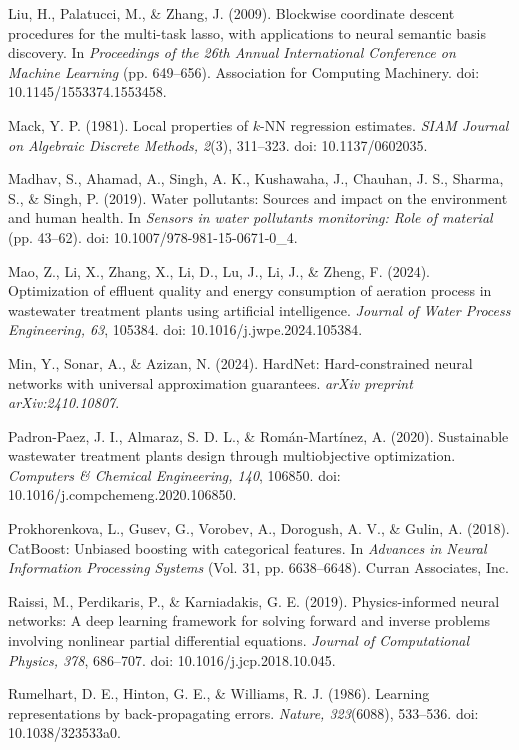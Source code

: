 \documentclass[a4paper,fleqn]{cas-sc}
\begin{document}
\noindent Liu, H., Palatucci, M., \& Zhang, J. (2009). Blockwise coordinate descent procedures for the multi-task lasso, with applications to neural semantic basis discovery. In \textit{Proceedings of the 26th Annual International Conference on Machine Learning} (pp. 649--656). Association for Computing Machinery. doi: 10.1145/1553374.1553458.

\noindent Mack, Y. P. (1981). Local properties of $k$-NN regression estimates. \textit{SIAM Journal on Algebraic Discrete Methods, 2}(3), 311--323. doi: 10.1137/0602035.

\noindent Madhav, S., Ahamad, A., Singh, A. K., Kushawaha, J., Chauhan, J. S., Sharma, S., \& Singh, P. (2019). Water pollutants: Sources and impact on the environment and human health. In \textit{Sensors in water pollutants monitoring: Role of material} (pp. 43--62). doi: 10.1007/978-981-15-0671-0\_4.

\noindent Mao, Z., Li, X., Zhang, X., Li, D., Lu, J., Li, J., \& Zheng, F. (2024). Optimization of effluent quality and energy consumption of aeration process in wastewater treatment plants using artificial intelligence. \textit{Journal of Water Process Engineering, 63}, 105384. doi: 10.1016/j.jwpe.2024.105384.

\noindent Min, Y., Sonar, A., \& Azizan, N. (2024). HardNet: Hard-constrained neural networks with universal approximation guarantees. \textit{arXiv preprint arXiv:2410.10807}.

\noindent Padron-Paez, J. I., Almaraz, S. D. L., \& Rom\'an-Mart\'inez, A. (2020). Sustainable wastewater treatment plants design through multiobjective optimization. \textit{Computers \& Chemical Engineering, 140}, 106850. doi: 10.1016/j.compchemeng.2020.106850.

\noindent Prokhorenkova, L., Gusev, G., Vorobev, A., Dorogush, A. V., \& Gulin, A. (2018). CatBoost: Unbiased boosting with categorical features. In \textit{Advances in Neural Information Processing Systems} (Vol. 31, pp. 6638--6648). Curran Associates, Inc.

\noindent Raissi, M., Perdikaris, P., \& Karniadakis, G. E. (2019). Physics-informed neural networks: A deep learning framework for solving forward and inverse problems involving nonlinear partial differential equations. \textit{Journal of Computational Physics, 378}, 686--707. doi: 10.1016/j.jcp.2018.10.045.

\noindent Rumelhart, D. E., Hinton, G. E., \& Williams, R. J. (1986). Learning representations by back-propagating errors. \textit{Nature, 323}(6088), 533--536. doi: 10.1038/323533a0.
\end{document}
